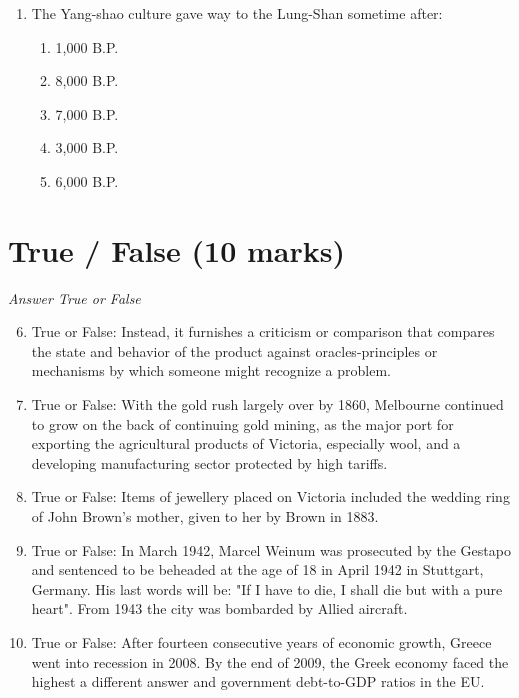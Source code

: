 \documentclass[12pt]{article}
\begin{document}
\begin{enumerate}[label=\arabic*.]
\begin{enumerate}[label=(\alph*)]
    \item the foramen magnum
    \item the skull
    \item the feet
    \item the femur
    \item the spine
\end{enumerate}
\item The Yang-shao culture gave way to the Lung-Shan sometime after:
\begin{enumerate}[label=(\alph*)]
    \item 1,000 B.P.
    \item 8,000 B.P.
    \item 7,000 B.P.
    \item 3,000 B.P.
    \item 6,000 B.P.
\end{enumerate}
\end{enumerate}

\section*{True / False (10 marks)}
\textit{Answer True or False}
\begin{enumerate}[label=\arabic*.]
\setcounter{enumi}{5}
\item True or False: Instead, it furnishes a criticism or comparison that compares the state and behavior of the product against oracles-principles or mechanisms by which someone might recognize a problem.
\item True or False: With the gold rush largely over by 1860, Melbourne continued to grow on the back of continuing gold mining, as the major port for exporting the agricultural products of Victoria, especially wool, and a developing manufacturing sector protected by high tariffs.
\item True or False: Items of jewellery placed on Victoria included the wedding ring of John Brown's mother, given to her by Brown in 1883.
\item True or False: In March 1942, Marcel Weinum was prosecuted by the Gestapo and sentenced to be beheaded at the age of 18 in April 1942 in Stuttgart, Germany. His last words will be: "If I have to die, I shall die but with a pure heart". From 1943 the city was bombarded by Allied aircraft.
\item True or False: After fourteen consecutive years of economic growth, Greece went into recession in 2008. By the end of 2009, the Greek economy faced the highest a different answer and government debt-to-GDP ratios in the EU.
\end{enumerate}
\end{document}
